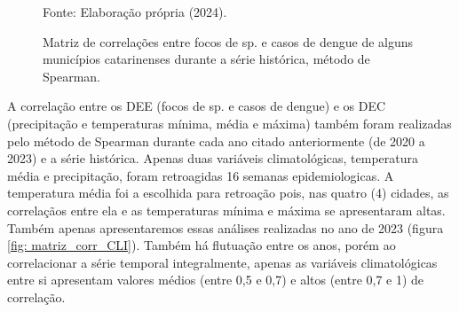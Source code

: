 \documentclass[
	12pt,				%
	openright,			%
	oneside,			%
	a4paper,			%
	english,			%
	french,				%
	spanish,			%
	brazil				%
	dvipsnames, table]{abntex2}
\begin{document}
\begin{figure}[htbp]
    \centering
    \caption{Matriz de correlações entre focos de  sp. e casos de dengue de alguns municípios catarinenses durante a série histórica, método de Spearman.}
    \label{fig: matriz_corr_DEEtotal}
    \hfill
    \hfill
    \small{Fonte: Elaboração própria (2024).}
\end{figure}

\indent A correlação entre os \acrshort{DEE} (focos de  sp. e casos de dengue) e os \acrshort{DEC} (precipitação e temperaturas mínima, média e máxima) também foram realizadas pelo método de Spearman durante cada ano citado anteriormente (de 2020 a 2023) e a série histórica. Apenas duas variáveis climatológicas, temperatura média e precipitação, foram retroagidas 16 semanas epidemiologicas. A temperatura média foi a escolhida para retroação pois, nas quatro (4) cidades, as correlaçãos entre ela e as temperaturas mínima e máxima se apresentaram altas. Também apenas apresentaremos essas análises realizadas no ano de 2023 (figura \ref{fig: matriz_corr_CLI}). Também há flutuação entre os anos, porém ao correlacionar a série temporal integralmente, apenas as variáveis climatológicas entre si apresentam valores médios (entre 0,5 e 0,7) e altos (entre 0,7 e 1) de correlação.
\end{document}
